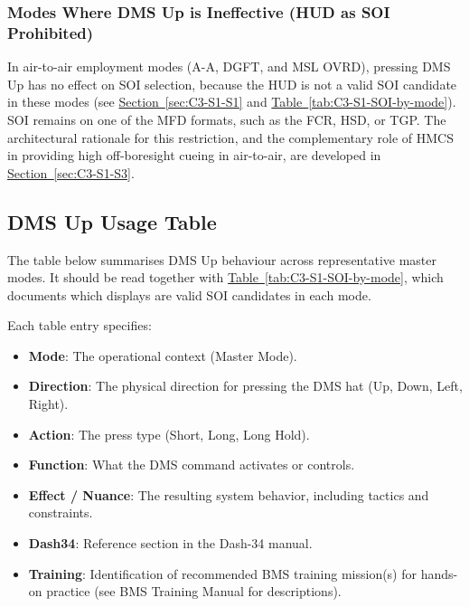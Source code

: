 \documentclass[11pt, a4paper, twoside]{report}
\newcommand{\secref}[1]{\hyperref[#1]{Section~\ref*{#1}}}
\newcommand{\tabref}[1]{\hyperref[#1]{Table~\ref*{#1}}}
\begin{document}
\subsubsection{Modes Where DMS Up is Ineffective (HUD as SOI Prohibited)}
\label{sec:C3-S2-S1-S2}

In air-to-air employment modes (A-A, DGFT, and MSL OVRD), pressing DMS Up has no effect on SOI selection, because the HUD is not a valid SOI candidate in these modes (see \secref{sec:C3-S1-S1} and \tabref{tab:C3-S1-SOI-by-mode}). SOI remains on one of the MFD formats, such as the FCR, HSD, or TGP. The architectural rationale for this restriction, and the complementary role of HMCS in providing high off-boresight cueing in air-to-air, are developed in \secref{sec:C3-S1-S3}.

\subsection{DMS Up Usage Table}
\label{sec:C3-S2-S2}

The table below summarises DMS Up behaviour across representative master modes. It should be read together with \tabref{tab:C3-S1-SOI-by-mode}, which documents which displays are valid SOI candidates in each mode.

Each table entry specifies:

\begin{itemize}
	\item \textbf{Mode}: The operational context (Master Mode).
	\item \textbf{Direction}: The physical direction for pressing the DMS hat (Up, Down, Left, Right).
	\item \textbf{Action}: The press type (Short, Long, Long Hold).
	\item \textbf{Function}: What the DMS command activates or controls.
	\item \textbf{Effect / Nuance}: The resulting system behavior, including tactics and constraints.
	\item \textbf{Dash34}: Reference section in the Dash-34 manual.
	\item \textbf{Training}: Identification of recommended BMS training mission(s) for hands-on practice (see BMS Training Manual for descriptions).
\end{itemize}
\end{document}

